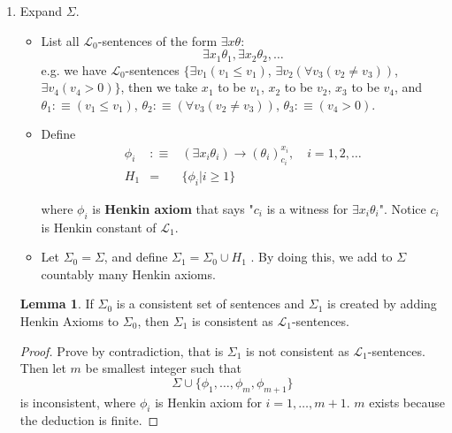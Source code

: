 \documentclass[11pt,letterpaper]{book}
\theoremstyle{definition}
\newtheorem{lemma}{Lemma}[section]
\begin{document}
\begin{enumerate}
\begin{proof}
\begin{itemize}
\end{itemize}


\end{proof}

\item{Expand $\Sigma$.}
\begin{itemize}
\item{List all $\mathcal{L}_0$-sentences of the form $\exists x \theta$:
$$ \exists x_1 \theta_1, \exists x_2 \theta_2, \ldots $$
e.g. we have $\mathcal{L}_0$-sentences  $\{ \exists v_1 (v_1 \leq v_1)$, $ 
\exists v_2 (\forall v_3 ( v_2 \neq v_3 ) )$, $\exists v_4 (v_4 > 0 ) \}$, 
then we take $x_1$ to be $v_1$, $x_2$ to be $v_2$, $x_3$ to be $v_4$, and
$\theta_1 :\equiv (v_1 \leq v_1) $, $\theta_2 :\equiv (\forall v_3 ( v_2 
\neq v_3 ) )$, $\theta_3 :\equiv (v_4 > 0 ) $.
}
\item{Define
\begin{eqnarray*}
\phi_i & :\equiv & ( \exists x_i \theta_i ) \rightarrow (\theta_i)_{c_i}
^{x_i}, \quad i = 1, 2, \ldots \\
H_1 & = & \{ \phi_i | i \geq 1 \}
\end{eqnarray*}

where $\phi_i$ is \textbf{Henkin axiom} that says "$c_i$ is a witness
for $\exists x_i \theta_i$". Notice $c_i$ is Henkin constant of
$\mathcal{L}_1$.
}
\item{Let $\Sigma_0 = \Sigma$, and define $\Sigma_1 = \Sigma_0 \cup H_1$
. By doing this, we add to $\Sigma$ countably many Henkin axioms.}

\end{itemize}

\begin{lemma}
If $\Sigma_0$ is a consistent set of sentences and $\Sigma_1$ is created
by adding Henkin Axioms to $\Sigma_0$, then $\Sigma_1$ is consistent as
$\mathcal{L}_1$-sentences.
\end{lemma}

\begin{proof}
Prove by contradiction, that is $\Sigma_1$ is not consistent as
$\mathcal{L}_1$-sentences. Then let $m$ be smallest integer such that
$$ \Sigma \cup \{ \phi_1, \ldots, \phi_m, \phi_{m+1} \} $$
is inconsistent, where $\phi_i$ is Henkin axiom for $i = 1, \ldots, 
m+1$. $m$ exists because the deduction is finite.


\end{proof}
\end{enumerate}
\end{document}
